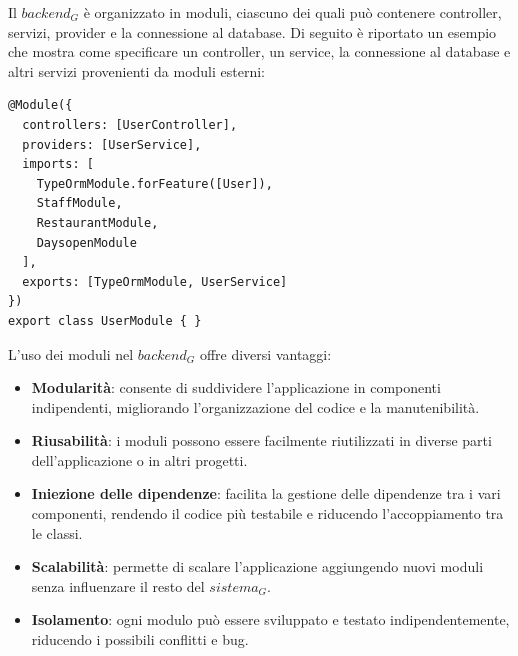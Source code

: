 \newpage
{}
Il $\textit{backend}_G$ è organizzato in moduli, ciascuno dei quali può contenere controller, servizi, provider e la connessione al database. Di seguito è riportato un esempio che mostra come specificare un controller, un service, la connessione al database e altri servizi provenienti da moduli esterni:
\begin{lstlisting}[style=ES6, caption={Esempio di modulo con controller, service, connessione al database e altri servizi da moduli esterni}]
@Module({
  controllers: [UserController],
  providers: [UserService],
  imports: [
    TypeOrmModule.forFeature([User]),
    StaffModule,
    RestaurantModule,
    DaysopenModule
  ],
  exports: [TypeOrmModule, UserService]
})
export class UserModule { }
\end{lstlisting}
L'uso dei moduli nel $\textit{backend}_G$ offre diversi vantaggi:
\begin{itemize}
  \item \textbf{Modularità}: consente di suddividere l'applicazione in componenti indipendenti, migliorando l'organizzazione del codice e la manutenibilità.
  \item \textbf{Riusabilità}: i moduli possono essere facilmente riutilizzati in diverse parti dell'applicazione o in altri progetti.
  \item \textbf{Iniezione delle dipendenze}: facilita la gestione delle dipendenze tra i vari componenti, rendendo il codice più testabile e riducendo l'accoppiamento tra le classi.
  \item \textbf{Scalabilità}: permette di scalare l'applicazione aggiungendo nuovi moduli senza influenzare il resto del $\textit{sistema}_G$.
  \item \textbf{Isolamento}: ogni modulo può essere sviluppato e testato indipendentemente, riducendo i possibili conflitti e bug.
\end{itemize}

\newpage
